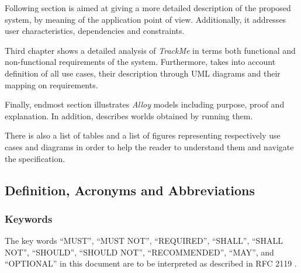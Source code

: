 \documentclass[a4paper]{article}
\begin{document}
        Following section is aimed at giving a more detailed description of the proposed system, by meaning of the application point of view. Additionally, it addresses user characteristics, dependencies and constraints.
        
        Third chapter shows a detailed analysis of \textit{TrackMe} in terms both functional and non-functional requirements of the system. Furthermore, takes into account definition of all use cases, their description through UML diagrams and their mapping on requirements.
        
        Finally, endmost section illustrates \textit{Alloy} models including purpose, proof and explanation. In addition, describes worlds obtained by running them.
        
        There is also a list of tables and a list of figures representing respectively use cases and diagrams in order to help the reader to understand them and navigate the specification.
        
    \subsection{Definition, Acronyms and  Abbreviations}
            \subsubsection{Keywords}
            The key words “MUST”, “MUST NOT”, “REQUIRED”, “SHALL”, “SHALL NOT”, “SHOULD”, “SHOULD NOT”, “RECOMMENDED”, “MAY”, and “OPTIONAL” in this document are to be interpreted as described in RFC 2119 \cite{bradner1997key}.
\end{document}
